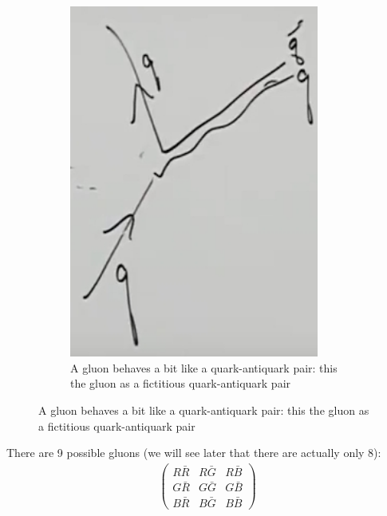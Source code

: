 \documentclass[]{article}
\begin{document}
\begin{figure}[H]
\begin{subfigure}{0.45\textwidth}
		\caption{A gluon behaves a bit like a quark-antiquark pair: this the gluon as a fictitious quark-antiquark pair}
		\includegraphics[width=0.9\textwidth]{2-2-gluon2}
	\end{subfigure}

\end{figure}

There are 9 possible gluons (we will see later that there are actually only 8):
\begin{align*}
\begin{pmatrix}
R\bar{R}&R\bar{G}&R\bar{B}\\
G\bar{R}&G\bar{G}&G\bar{B}\\
B\bar{R}&B\bar{G}&B\bar{B}
\end{pmatrix}
\end{align*}
\end{document}
